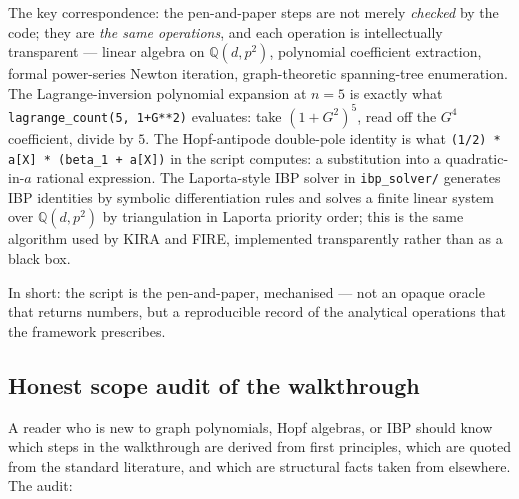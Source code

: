 \documentclass[11pt,a4paper]{article}
\theoremstyle{definition}
\theoremstyle{plain}
\begin{document}
The key correspondence: the pen-and-paper steps are not merely
\emph{checked} by the code; they are \emph{the same operations}, and
each operation is intellectually transparent --- linear algebra on
$\mathbb{Q}(d, p^2)$, polynomial coefficient extraction, formal
power-series Newton iteration, graph-theoretic spanning-tree
enumeration.  The Lagrange-inversion polynomial expansion at $n = 5$
is exactly what \texttt{lagrange\_count(5, 1+G**2)} evaluates: take
$(1+G^2)^5$, read off the $G^4$ coefficient, divide by $5$.  The
Hopf-antipode double-pole identity is what
\texttt{(1/2) * a[X] * (beta\_1 + a[X])} in the script computes: a
substitution into a quadratic-in-$a$ rational expression.  The
Laporta-style IBP solver in \texttt{ibp\_solver/} generates IBP
identities by symbolic differentiation rules and solves a finite
linear system over $\mathbb{Q}(d, p^2)$ by triangulation in Laporta
priority order; this is the same algorithm used by KIRA and FIRE,
implemented transparently rather than as a black box.

In short: the script is the pen-and-paper, mechanised --- not an
opaque oracle that returns numbers, but a reproducible record of the
analytical operations that the framework prescribes.

\subsection{Honest scope audit of the walkthrough}\label{app:audit}

A reader who is new to graph polynomials, Hopf algebras, or IBP
should know which steps in the walkthrough are derived from first
principles, which are quoted from the standard literature, and which
are structural facts taken from elsewhere.  The audit:
\end{document}
